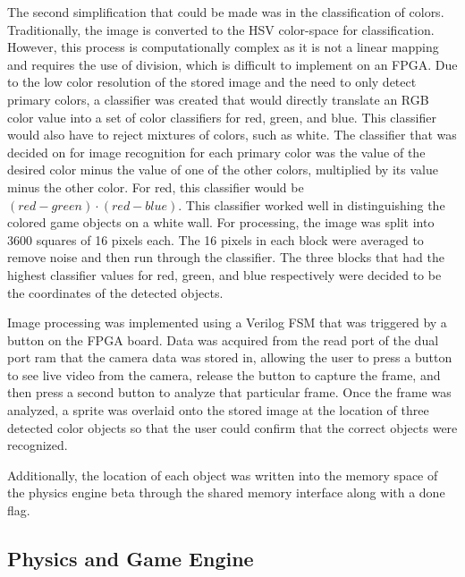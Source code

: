 \documentclass{article}
\begin{document}
The second simplification that could be made was in the classification of colors. Traditionally, the image is converted to the HSV color-space for classification. However, this process is computationally complex as it is not a linear mapping and requires the use of division, which is difficult to implement on an FPGA. Due to the low color resolution of the stored image and the need to only detect primary colors, a classifier was created that would directly translate an RGB color value into a set of color classifiers for red, green, and blue. This classifier would also have to reject mixtures of colors, such as white.
The classifier that was decided on for image recognition for each primary color was the value of the desired color minus the value of one of the other colors, multiplied by its value minus the other color. For red, this classifier would be $(red-green)\cdot(red-blue)$. This classifier worked well in distinguishing the colored game objects on a white wall. For processing, the image was split into 3600 squares of 16 pixels each. The 16 pixels in each block were averaged to remove noise and then run through the classifier. The three blocks that had the highest classifier values for red, green, and blue respectively were decided to be the coordinates of the detected objects. 

Image processing was implemented using a Verilog FSM that was triggered by a button on the FPGA board. Data was acquired from the read port of the dual port ram that the camera data was stored in, allowing the user to press a button to see live video from the camera, release the button to capture the frame, and then press a second button to analyze that particular frame. Once the frame was analyzed, a sprite was overlaid onto the stored image at the location of three detected color objects so that the user could confirm that the correct objects were recognized.

 Additionally, the location of each object was written into the memory space of the physics engine beta through the shared memory interface along with a done flag. 
 
\subsection{Physics and Game Engine} \label{physics}
\end{document}
